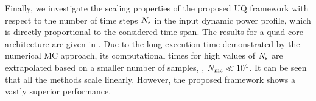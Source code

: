 Finally, we investigate the scaling properties of the proposed UQ framework with respect to the number of time steps $N_\text{s}$ in the input dynamic power profile, which is directly proportional to the considered time span. The results for a quad-core architecture are given in . Due to the long execution time demonstrated by the numerical MC approach, its computational times for high values of $N_\text{s}$ are extrapolated based on a smaller number of samples, \ie, $N_\text{mc} \ll 10^4$. It can be seen that all the methods scale linearly. However, the proposed framework shows a vastly superior performance.
